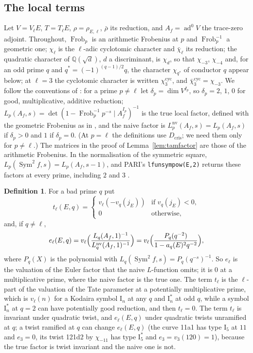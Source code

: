 \documentclass[11pt]{amsart}
\theoremstyle{definition}
\newtheorem{definition}[theorem]{Definition}
\newcommand{\Q}{\mathbb{Q}}
\newcommand{\ad}{\operatorname{ad}^0}
\newcommand{\Sym}{\operatorname{Sym}^2}
\newcommand{\nv}{\mathrm{nv}}
\newcommand{\Frob}{\operatorname{Frob}}
\newcommand{\cyc}{\mathrm{cyc}}
\begin{document}
\subsection{The local terms}
Let $V=V_\ell E$, $T=T_\ell E$, $\rho=\rho_{E,\ell}$, $\bar\rho$ its reduction, and $A_f=\ad V$ the trace-zero adjoint. Throughout, $\Frob_p$ is an arithmetic Frobenius at $p$ and $\Frob_p^{-1}$ a geometric one; $\chi_\ell$ is the $\ell$-adic cyclotomic character and $\bar\chi_\ell$ its reduction; the quadratic character of $\Q(\sqrt d)$, $d$ a discriminant, is $\chi_d$, so that $\chi_{-3}$, $\chi_{-4}$ and, for an odd prime $q$ and $q^*=(-1)^{(q-1)/2}q$, the character $\chi_{q^*}$ of conductor $q$ appear below; at $\ell=3$ the cyclotomic character is written $\chi_3^{\cyc}$, and $\bar\chi_3^{\cyc}=\chi_{-3}$. We follow the conventions of \cite[\S1.7.2]{DFG04}: for a prime $p\ne\ell$ let $\delta_p=\dim V^{I_p}$, so $\delta_p=2$, $1$, $0$ for good, multiplicative, additive reduction; $L_p(A_f,s)=\det(1-\Frob_p^{-1}p^{-s}\mid A_f^{I_p})^{-1}$ is the true local factor, defined with the geometric Frobenius as in \cite[\S1.1.1]{DFG04}, and the naive factor is $L_p^{\nv}(A_f,s)=L_p(A_f,s)$ if $\delta_p>0$ and $1$ if $\delta_p=0$. (At $p=\ell$ the definitions use $D_{\mathrm{cris}}$; we need them only for $p\ne\ell$.) The matrices in the proof of Lemma~\ref{lem:tamfactor} are those of the arithmetic Frobenius. In the normalisation of the symmetric square, $L_p(\Sym f,s)=L_p(A_f,s-1)$, and PARI's \texttt{lfunsympow(E,2)} returns these factors at every prime, including $2$ and $3$ \cite{PARI}.

\begin{definition}\label{def:terms}
For a bad prime $q$ put
\[
t_\ell(E,q)=\begin{cases}v_\ell(-v_q(j_E))&\text{if }v_q(j_E)<0,\\0&\text{otherwise,}\end{cases}
\]
and, if $q\ne\ell$,
\[
e_\ell(E,q)=v_\ell\Bigl(\frac{L_q(A_f,1)^{-1}}{L_q^{\nv}(A_f,1)^{-1}}\Bigr)=v_\ell\Bigl(\frac{P_q(q^{-2})}{1-a_q(E)^2q^{-2}}\Bigr),
\]
where $P_q(X)$ is the polynomial with $L_q(\Sym f,s)=P_q(q^{-s})^{-1}$. So $e_\ell$ is the valuation of the Euler factor that the naive $L$-function omits; it is $0$ at a multiplicative prime, where the naive factor is the true one. The term $t_\ell$ is the $\ell$-part of the valuation of the Tate parameter at a potentially multiplicative prime, which is $v_\ell(n)$ for a Kodaira symbol $\mathrm{I}_n$ at any $q$ and $\mathrm{I}_n^*$ at odd $q$, while a symbol $\mathrm{I}_n^*$ at $q=2$ can have potentially good reduction, and then $t_\ell=0$. The term $t_\ell$ is invariant under quadratic twist, and $e_\ell(E,q)$ under quadratic twists unramified at $q$; a twist ramified at $q$ can change $e_\ell(E,q)$ (the curve 11a1 has type $\mathrm{I}_5$ at $11$ and $e_3=0$, its twist 121d2 by $\chi_{-11}$ has type $\mathrm{I}_5^*$ and $e_3=v_3(120)=1$), because the true factor is twist invariant and the naive one is not.
\end{definition}
\end{document}
